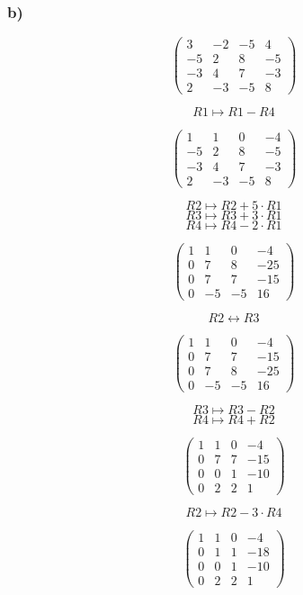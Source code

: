 \documentclass[lineaire_algebra_oplossingen.tex]{subfiles}
\begin{document}
\subsubsection*{b)}

$$
\begin{pmatrix}
3 & -2 & -5 & 4\\
-5 & 2 & 8 & -5\\
-3 & 4 & 7 & -3\\
2 & -3 & -5 & 8
\end{pmatrix}
$$

$$ R1 \longmapsto R1 - R4$$

$$
\begin{pmatrix}
1 & 1 & 0 & -4\\
-5 & 2 & 8 & -5\\
-3 & 4 & 7 & -3\\
2 & -3 & -5 & 8
\end{pmatrix}
$$

$$R2 \longmapsto R2 + 5\cdot R1$$
$$R3 \longmapsto R3 + 3\cdot R1$$
$$R4 \longmapsto R4 - 2\cdot R1$$

$$
\begin{pmatrix}
1 & 1 & 0 & -4\\
0 & 7 & 8 & -25\\
0 & 7 & 7 & -15\\
0 & -5 & -5 & 16
\end{pmatrix}
$$

$$R2 \leftrightarrow R3$$

$$
\begin{pmatrix}
1 & 1 & 0 & -4\\
0 & 7 & 7 & -15\\
0 & 7 & 8 & -25\\
0 & -5 & -5 & 16
\end{pmatrix}
$$

$$R3 \longmapsto R3 - R2$$
$$R4 \longmapsto R4 + R2$$

$$
\begin{pmatrix}
1 & 1 & 0 & -4\\
0 & 7 & 7 & -15\\
0 & 0 & 1 & -10\\
0 & 2 & 2 & 1
\end{pmatrix}
$$

$$R2 \longmapsto R2 - 3\cdot R4$$

$$
\begin{pmatrix}
1 & 1 & 0 & -4\\
0 & 1 & 1 & -18\\
0 & 0 & 1 & -10\\
0 & 2 & 2 & 1
\end{pmatrix}
$$
\end{document}
